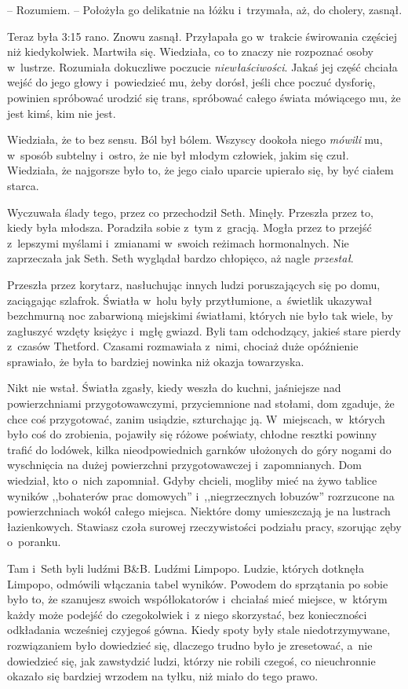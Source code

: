 \documentclass[oneside,polish,11pt,sfheadings]{mwbk}
\begin{document}
-- Rozumiem. -- Położyła go delikatnie na łóżku i~trzymała, aż, do
cholery, zasnął.

Teraz była 3:15 rano. Znowu zasnął. Przyłapała go w~trakcie świrowania
częściej niż kiedykolwiek. Martwiła się. Wiedziała, co to znaczy nie
rozpoznać osoby w~lustrze. Rozumiała dokuczliwe poczucie
\textit{niewłaściwości}. Jakaś jej część chciała wejść do jego głowy i~powiedzieć mu, żeby dorósł, jeśli chce poczuć dysforię, powinien
spróbować urodzić się trans, spróbować całego świata mówiącego mu, że
jest kimś, kim nie jest.

Wiedziała, że to bez sensu. Ból był bólem. Wszyscy dookoła niego
\textit{mówili} mu, w~sposób subtelny i~ostro, że nie był młodym człowiek,
jakim się czuł. Wiedziała, że najgorsze było to, że jego ciało uparcie
upierało się, by być ciałem starca.

Wyczuwała ślady tego, przez co przechodził Seth. Minęły. Przeszła przez
to, kiedy była młodsza. Poradziła sobie z~tym z~gracją. Mogła przez to
przejść z~lepszymi myślami i~zmianami w~swoich reżimach hormonalnych.
Nie zaprzeczała jak Seth. Seth wyglądał bardzo chłopięco, aż nagle
\textit{przestał}.

Przeszła przez korytarz, nasłuchując innych ludzi poruszających się po
domu, zaciągając szlafrok. Światła w~holu były przytłumione, a~świetlik
ukazywał bezchmurną noc zabarwioną miejskimi światłami, których nie było
tak wiele, by zagłuszyć wzdęty księżyc i~mgłę gwiazd. Byli tam
odchodzący, jakieś stare pierdy z~czasów Thetford. Czasami rozmawiała z~nimi, chociaż duże opóźnienie sprawiało, że była to bardziej nowinka niż
okazja towarzyska.

Nikt nie wstał. Światła zgasły, kiedy weszła do kuchni, jaśniejsze nad
powierzchniami przygotowawczymi, przyciemnione nad stołami, dom zgaduje,
że chce coś przygotować, zanim usiądzie, szturchając ją. W~miejscach, w~których było coś do zrobienia, pojawiły się różowe poświaty, chłodne
resztki powinny trafić do lodówek, kilka nieodpowiednich garnków
ułożonych do góry nogami do wyschnięcia na dużej powierzchni
przygotowawczej i~zapomnianych. Dom wiedział, kto o~nich zapomniał.
Gdyby chcieli, mogliby mieć na żywo tablice wyników ,,bohaterów prac
domowych'' i~,,niegrzecznych łobuzów'' rozrzucone na powierzchniach
wokół całego miejsca. Niektóre domy umieszczają je na lustrach
łazienkowych. Stawiasz czoła surowej rzeczywistości podziału pracy,
szorując zęby o~poranku.

Tam i~Seth byli ludźmi B\&B. Ludźmi Limpopo. Ludzie, których dotknęła
Limpopo, odmówili włączania tabel wyników. Powodem do sprzątania po
sobie było to, że szanujesz swoich współlokatorów i~chciałaś mieć
miejsce, w~którym każdy może podejść do czegokolwiek i~z niego
skorzystać, bez konieczności odkładania wcześniej czyjegoś gówna. Kiedy
spoty były stale niedotrzymywane, rozwiązaniem było dowiedzieć się,
dlaczego trudno było je zresetować, a~nie dowiedzieć się, jak zawstydzić
ludzi, którzy nie robili czegoś, co nieuchronnie okazało się bardziej
wrzodem na tyłku, niż miało do tego prawo.
\end{document}
